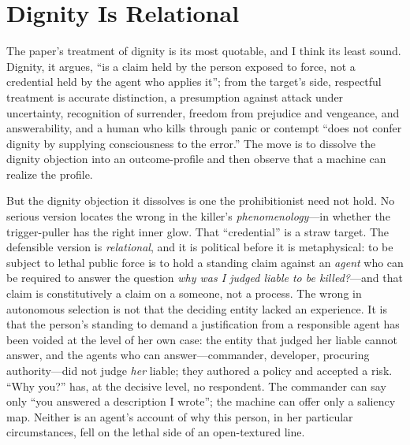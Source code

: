 \documentclass[11pt]{article}
\begin{document}
\section{Dignity Is Relational}
\label{sec:dignity}

The paper's treatment of dignity is its most quotable, and I think its least sound. Dignity, it argues, ``is a claim held by the person exposed to force, not a credential held by the agent who applies it''; from the target's side, respectful treatment is accurate distinction, a presumption against attack under uncertainty, recognition of surrender, freedom from prejudice and vengeance, and answerability, and a human who kills through panic or contempt ``does not confer dignity by supplying consciousness to the error.'' The move is to dissolve the dignity objection into an outcome-profile and then observe that a machine can realize the profile.

But the dignity objection it dissolves is one the prohibitionist need not hold. No serious version locates the wrong in the killer's \emph{phenomenology}---in whether the trigger-puller has the right inner glow. That ``credential'' is a straw target. The defensible version is \emph{relational}, and it is political before it is metaphysical: to be subject to lethal public force is to hold a standing claim against an \emph{agent} who can be required to answer the question \emph{why was I judged liable to be killed?}---and that claim is constitutively a claim on a someone, not a process. The wrong in autonomous selection is not that the deciding entity lacked an experience. It is that the person's standing to demand a justification from a responsible agent has been voided at the level of her own case: the entity that judged her liable cannot answer, and the agents who can answer---commander, developer, procuring authority---did not judge \emph{her} liable; they authored a policy and accepted a risk. ``Why you?'' has, at the decisive level, no respondent. The commander can say only ``you answered a description I wrote''; the machine can offer only a saliency map. Neither is an agent's account of why this person, in her particular circumstances, fell on the lethal side of an open-textured line.
\end{document}
